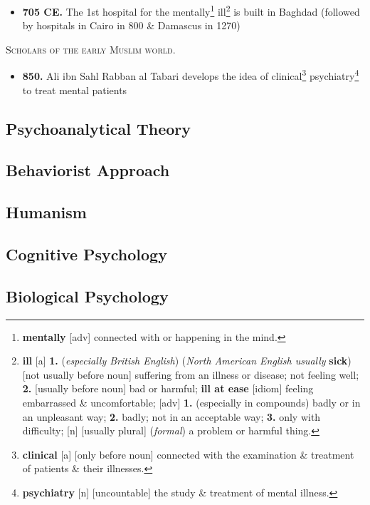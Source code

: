 \documentclass[oneside]{book}
\numberwithin{equation}{section}
\begin{document}
\begin{itemize}
	\item \textbf{705 CE.} The 1st hospital for the mentally\footnote{\textbf{mentally} [adv] connected with or happening in the mind.} ill\footnote{\textbf{ill} [a] \textbf{1.} (\textit{especially British English}) (\textit{North American English usually} \textbf{sick}) [not usually before noun] suffering from an illness or disease; not feeling well; \textbf{2.} [usually before noun] bad or harmful; \textbf{ill at ease} [idiom] feeling embarrassed \& uncomfortable; [adv] \textbf{1.} (especially in compounds) badly or in an unpleasant way; \textbf{2.} badly; not in an acceptable way; \textbf{3.} only with difficulty; [n] [usually plural] (\textit{formal}) a problem or harmful thing.} is built in Baghdad (followed by hospitals in Cairo in 800 \& Damascus in 1270)
\end{itemize}
\textsc{Scholars of the early Muslim world.}
\begin{itemize}
	\item \textbf{850.} Ali ibn Sahl Rabban al Tabari develops the idea of clinical\footnote{\textbf{clinical} [a] [only before noun] connected with the examination \& treatment of patients \& their illnesses.} psychiatry\footnote{\textbf{psychiatry} [n] [uncountable] the study \& treatment of mental illness.} to treat mental patients
\end{itemize}

\subsection{Psychoanalytical Theory}

\subsection{Behaviorist Approach}

\subsection{Humanism}

\subsection{Cognitive Psychology}

\subsection{Biological Psychology}
\end{document}

